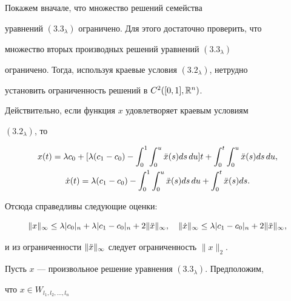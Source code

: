\begin{pf}
\begin{lems}
\end{lems}





\begin{pf}


Покажем вначале, что множество решений семейства 


уравнений $(3.3_\lambda)$ ограничено. Для этого достаточно проверить, что


множество вторых производных решений уравнений $(3.3_\lambda)$


ограничено. Тогда, используя краевые условия $(3.2_\lambda)$, нетрудно


установить ограниченность решений в $C^2([0,1], {\Bbb R}^n)$.


Действительно, если функция $x$ удовлетворяет краевым условиям 


$(3.2_\lambda)$, то


\begin{gather*}


x(t) = \lambda c_0 + [\lambda (c_1-c_0)- \int_0^1\int_0^u


\Ddot x(s)ds\, du]t + \int_0^t\int_0^u


\Ddot x(s)ds\, du, \\


%


\Dot x(t) = \lambda (c_1-c_0) - 


\int_0^1\int_0^u \Ddot x(s)ds\, du +


\int_0^t \Ddot x(s)ds.


\end{gather*}


Отсюда справедливы следующие оценки:


\begin{equation}


\|x\|_\infty \leq \lambda |c_0|_n + \lambda |c_1-c_0|_n + 2\|\Ddot


x\|_\infty, \quad


\|\Dot x\|_\infty \leq \lambda |c_1-c_0|_n + 2\|\Ddot x\|_\infty,


\end{equation}


и из ограниченности $\|\Ddot x\|_\infty$ следует ограниченность $\|x\|_2$.





Пусть $x$ --- произвольное решение уравнения $(3.3_\lambda)$. Предположим,


что $x\in W_{l_1, l_2, \dotsc, l_n}$ 



\end{pf}
\end{pf}

